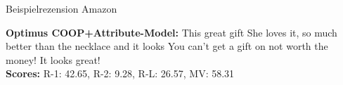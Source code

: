 \begin{frame}{Beispielrezension Amazon}
\begin{Rezension}[!h]
{{        \textbf{Optimus COOP+Attribute-Model:} \textcolor{HighlightColor}{This} \ccolorbox[BackgroundColor]{ \textcolor{HighlightColor}{\strut is a}} \textcolor{HighlightColor}{great} gift \underline{\ccolorbox[BackgroundColor]{ \textcolor{HighlightColor}{\strut for the}} \ccolorbox[BackgroundColor]{ \textcolor{HighlightColor}{\strut price.}}} She loves \textcolor{HighlightColor}{it}\textcolor{HighlightColor}{,} \textcolor{HighlightColor}{so} much better than \textcolor{HighlightColor}{the} \textcolor{HighlightColor}{necklace} \textcolor{HighlightColor}{and} \textcolor{HighlightColor}{it} looks \ccolorbox[BackgroundColor]{ \textcolor{HighlightColor}{\strut beautiful.}} You \textcolor{HighlightColor}{can't} \textcolor{HighlightColor}{get} \textcolor{HighlightColor}{a} gift on \ccolorbox[BackgroundColor]{ \textcolor{HighlightColor}{\strut the chain}} \ccolorbox[BackgroundColor]{ \textcolor{HighlightColor}{\strut, but}} \ccolorbox[BackgroundColor]{ \textcolor{HighlightColor}{\strut it is}} not worth \textcolor{HighlightColor}{the} money\textcolor{HighlightColor}{!} \textcolor{HighlightColor}{It} looks \textcolor{HighlightColor}{great}\textcolor{HighlightColor}{!}         \\ 
        \textbf{Scores:} R-1: 42.65, R-2: 9.28, R-L: 26.57, MV: 58.31\\ \\
}}
\end{Rezension}
\end{frame}

